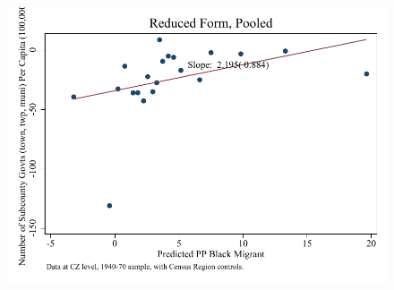 \documentclass{article}
\begin{document}
\begin{figure}
\centering
\includegraphics{figures/simplefigs/pooled_gen_subcounty_pc_C3_rf.pdf}
\end{figure}
\clearpage
\end{document}
